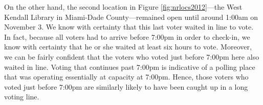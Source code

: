 \documentclass[12pt,titlepage]{article}
\begin{document}
On the other hand, the second location in Figure
\ref{fig:nrlocs2012}---the West Kendall Library in Miami-Dade
County---remained open until around 1:00am on November 3.  We know
with certainty that this last voter waited in line to vote.  In fact,
because all voters had to arrive before 7:00pm in order to check-in,
we know with certainty that he or she waited at least six hours to
vote.  Moreover, we can be fairly confident that the voters who voted
just before 7:00pm here also waited in line.  Voting that continues
past 7:00pm is indicative of a polling place that was operating
essentially at capacity at 7:00pm.  Hence, those voters who voted just
before 7:00pm are similarly likely to have been caught up in a long
voting line.

 
\end{document}
